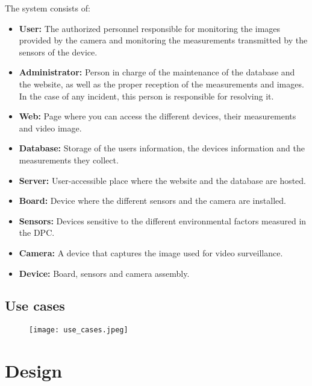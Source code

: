 The system consists of:
\begin{itemize}
	\item \textbf{User:} The authorized personnel responsible for monitoring the images provided by the camera and monitoring the measurements transmitted by the sensors of the device.
	\item \textbf{Administrator:} Person in charge of the maintenance of the database and the website, as well as the proper reception of the measurements and images. In the case of any incident, this person is responsible for resolving it.
	\item \textbf{Web:} Page where you can access the different devices, their measurements and video image.
	\item \textbf{Database:} Storage of the users information, the devices information and the measurements they collect.
	\item \textbf{Server:} User-accessible place where the website and the database are hosted.
	\item \textbf{Board:} Device where the different sensors and the camera are installed.
	\item \textbf{Sensors:} Devices sensitive to the different environmental factors measured in the DPC\@.
	\item \textbf{Camera:} A device that captures the image used for video surveillance.
	\item \textbf{Device:} Board, sensors and camera assembly.
\end{itemize}

\subsection{Use cases}\label{subsec:use-cases}
\begin{figure}[H]
	{\texttt{[image: use\_cases.jpeg]}}
\end{figure}

\section{Design}\label{sec:design}
